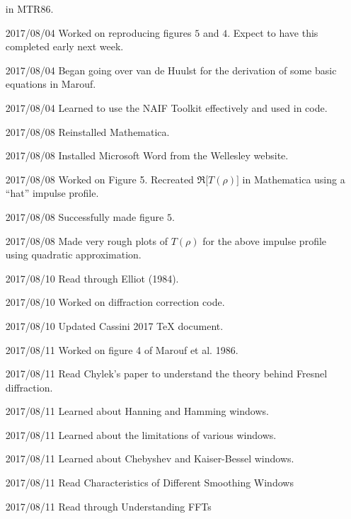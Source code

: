 \documentclass[crop=false,class=article,oneside]{standalone}
\begin{document}
\begin{enumerate}[leftmargin=55pt]
                              in MTR86.
            \item[2017/08/04] Worked on reproducing figures $5$ and $4$.
                              Expect to have this completed early next week.
            \item[2017/08/04] Began going over van de Huulst for the derivation
                              of some basic equations in Marouf.
            \item[2017/08/04] Learned to use the NAIF Toolkit effectively
                              and used in code.
            \item[2017/08/08] Reinstalled Mathematica.
            \item[2017/08/08] Installed Microsoft Word from the
                              Wellesley website.
            \item[2017/08/08] Worked on Figure 5. Recreated
                              $\Re\big[T(\rho)\big]$ in Mathematica using a
                              ``hat'' impulse profile.
            \item[2017/08/08] Successfully made figure $5$. 
            \item[2017/08/08] Made very rough plots of $T(\rho)$ for the
                              above impulse profile using quadratic
                              approximation.
            \item[2017/08/10] Read through Elliot (1984).
            \item[2017/08/10] Worked on diffraction correction code.
            \item[2017/08/10] Updated Cassini 2017 TeX document.
            \item[2017/08/11] Worked on figure 4 of Marouf et al. 1986.
            \item[2017/08/11] Read Chylek's paper to understand the theory behind Fresnel diffraction.
            \item[2017/08/11] Learned about Hanning and Hamming windows.
            \item[2017/08/11] Learned about the limitations
                              of various windows.
            \item[2017/08/11] Learned about Chebyshev and
                              Kaiser-Bessel windows.
            \item[2017/08/11] Read Characteristics of
                              Different Smoothing Windows
            \item[2017/08/11] Read through Understanding FFTs

\end{enumerate}
\end{document}
